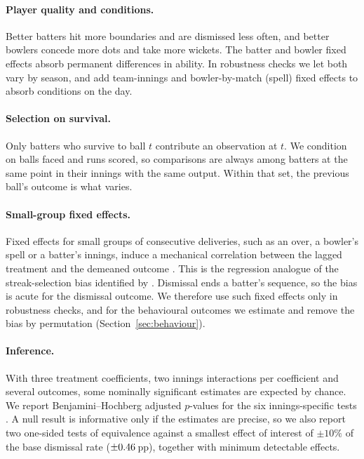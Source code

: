 \documentclass[11pt]{article}
\newcommand{\pp}{\,pp}
\begin{document}
\paragraph{Player quality and conditions.} Better batters hit more boundaries and are dismissed less often, and better bowlers concede more dots and take more wickets. The batter and bowler fixed effects absorb permanent differences in ability. In robustness checks we let both vary by season, and add team-innings and bowler-by-match (spell) fixed effects to absorb conditions on the day.

\paragraph{Selection on survival.} Only batters who survive to ball $t$ contribute an observation at $t$. We condition on balls faced and runs scored, so comparisons are always among batters at the same point in their innings with the same output. Within that set, the previous ball's outcome is what varies.

\paragraph{Small-group fixed effects.} Fixed effects for small groups of consecutive deliveries, such as an over, a bowler's spell or a batter's innings, induce a mechanical correlation between the lagged treatment and the demeaned outcome \citep{nickell1981biases}. This is the regression analogue of the streak-selection bias identified by \citet{miller2018surprised}. Dismissal ends a batter's sequence, so the bias is acute for the dismissal outcome. We therefore use such fixed effects only in robustness checks, and for the behavioural outcomes we estimate and remove the bias by permutation (Section~\ref{sec:behaviour}).

\paragraph{Inference.} With three treatment coefficients, two innings interactions per coefficient and several outcomes, some nominally significant estimates are expected by chance. We report Benjamini--Hochberg adjusted $p$-values for the six innings-specific tests \citep{benjamini1995controlling}. A null result is informative only if the estimates are precise, so we also report two one-sided tests of equivalence \citep{schuirmann1987comparison,lakens2017equivalence} against a smallest effect of interest of $\pm 10\%$ of the base dismissal rate ($\pm0.46$\pp{}), together with minimum detectable effects.
\end{document}
